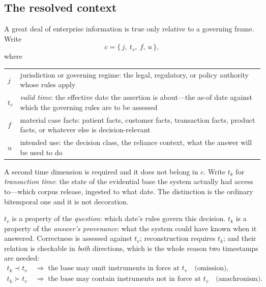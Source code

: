\subsection{The resolved context}
\label{sec:resolved-context}

A great deal of enterprise information is true only relative to a governing frame.
Write
\begin{equation}
  c = \{\, j,\ t_v,\ f,\ u \,\},
  \label{eq:context}
\end{equation}
where

\begin{center}
\begin{tabular}{@{}l>{\raggedright\arraybackslash}p{10.6cm}@{}}
\toprule
$j$ & jurisdiction or governing regime: the legal, regulatory, or policy authority
      whose rules apply \\
$t_v$ & \emph{valid time}: the effective date the assertion is about---the as-of date
      against which the governing rules are to be assessed \\
$f$ & material case facts: patient facts, customer facts, transaction facts,
      product facts, or whatever else is decision-relevant \\
$u$ & intended use: the decision class, the reliance context, what the answer will
      be used to do \\
\bottomrule
\end{tabular}
\end{center}

A second time dimension is required and it does not belong in $c$. Write $t_k$ for
\emph{transaction time}: the state of the evidential base the system actually had
access to---which corpus release, ingested to what date. The distinction is the
ordinary bitemporal one and it is not decoration.

$t_v$ is a property of the \emph{question}: which date's rules govern this decision.
$t_k$ is a property of the \emph{answer's provenance}: what the system could have
known when it answered. Correctness is assessed against $t_v$; reconstruction requires $t_k$; and their
relation is checkable in \emph{both} directions, which is the whole reason two
timestamps are needed:
\begin{align}
  t_k \prec t_v &\;\Longrightarrow\; \text{the base may omit instruments in force at }
    t_v \quad \text{(omission)}, \label{eq:bitemporal-stale}\\
  t_k \succ t_v &\;\Longrightarrow\; \text{the base may contain instruments not in
    force at } t_v \quad \text{(anachronism)}. \label{eq:bitemporal-anachronism}
\end{align}

